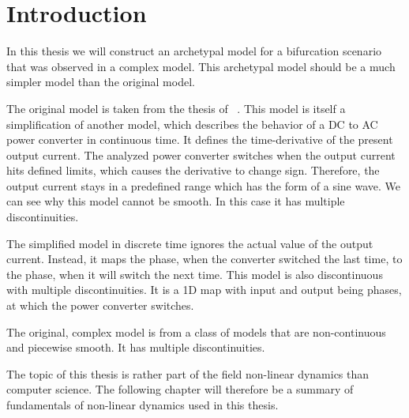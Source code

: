 \chapter{Introduction}

In this thesis we will construct an archetypal model for a bifurcation scenario that was observed in a complex model.
This archetypal model should be a much simpler model than the original model.

The original model is taken from the thesis of ~\cite{akyuz2022}.
This model is itself a simplification of another model, which describes the behavior of a DC to AC power converter in continuous time.
It defines the time-derivative of the present output current.
The analyzed power converter switches when the output current hits defined limits, which causes the derivative to change sign.
Therefore, the output current stays in a predefined range which has the form of a sine wave.
We can see why this model cannot be smooth.
In this case it has multiple discontinuities.

The simplified model in discrete time ignores the actual value of the output current.
Instead, it maps the phase, when the converter switched the last time, to the phase, when it will switch the next time.
This model is also discontinuous with multiple discontinuities.
It is a 1D map with input and output being phases, at which the power converter switches.

The original, complex model is from a class of models that are non-continuous and piecewise smooth.
It has multiple discontinuities.

The topic of this thesis is rather part of the field non-linear dynamics than computer science.
The following chapter will therefore be a summary of fundamentals of non-linear dynamics used in this thesis.

